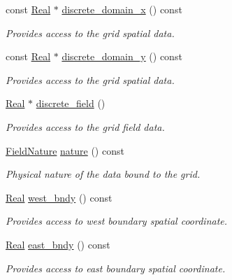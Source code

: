 \begin{DoxyCompactItemize}
const \hyperlink{group__c01-roots_gac080bbbf5cbb5502c9f00405f894857d}{Real} $\ast$ \hyperlink{classmtk_1_1UniStgGrid2D_ab2f70cf5cd0a2d5486992d9f2f8baa4a}{discrete\+\_\+domain\+\_\+x} () const 
\begin{DoxyCompactList}\small\item\em Provides access to the grid spatial data. \end{DoxyCompactList}\item 
const \hyperlink{group__c01-roots_gac080bbbf5cbb5502c9f00405f894857d}{Real} $\ast$ \hyperlink{classmtk_1_1UniStgGrid2D_ac33a58d65105550dcf6f6b92b48b5105}{discrete\+\_\+domain\+\_\+y} () const 
\begin{DoxyCompactList}\small\item\em Provides access to the grid spatial data. \end{DoxyCompactList}\item 
\hyperlink{group__c01-roots_gac080bbbf5cbb5502c9f00405f894857d}{Real} $\ast$ \hyperlink{classmtk_1_1UniStgGrid2D_a3e72d59843a3f9c5e47da07e5850dfe0}{discrete\+\_\+field} ()
\begin{DoxyCompactList}\small\item\em Provides access to the grid field data. \end{DoxyCompactList}\item 
\hyperlink{group__c02-enums_ga4c54f2a329cfb4e56213b02a259d19e2}{Field\+Nature} \hyperlink{classmtk_1_1UniStgGrid2D_a99a3a9cdb05b7306be99bde935509e30}{nature} () const 
\begin{DoxyCompactList}\small\item\em Physical nature of the data bound to the grid. \end{DoxyCompactList}\item 
\hyperlink{group__c01-roots_gac080bbbf5cbb5502c9f00405f894857d}{Real} \hyperlink{classmtk_1_1UniStgGrid2D_af2b1712387ded85edaf2b64617d3fc13}{west\+\_\+bndy} () const 
\begin{DoxyCompactList}\small\item\em Provides access to west boundary spatial coordinate. \end{DoxyCompactList}\item 
\hyperlink{group__c01-roots_gac080bbbf5cbb5502c9f00405f894857d}{Real} \hyperlink{classmtk_1_1UniStgGrid2D_a03f689eb29a6369b82ce1207c655d5ff}{east\+\_\+bndy} () const 
\begin{DoxyCompactList}\small\item\em Provides access to east boundary spatial coordinate. \end{DoxyCompactList}\item 

\end{DoxyCompactItemize}
